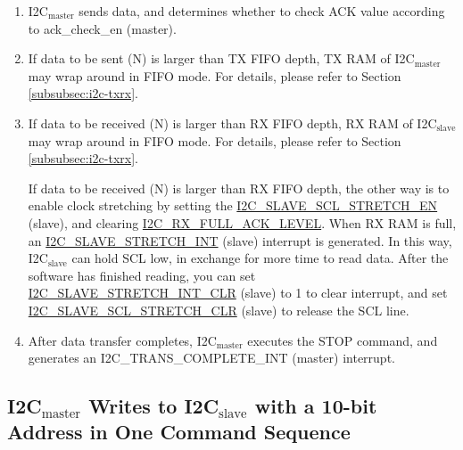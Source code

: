 \documentclass[main\_\_EN.tex]{subfiles}
\begin{document}
\begin{enumerate}
\begin{itemize}
\item Match: If the received ACK value matches ack\_exp (master) (the expected ACK value) in the WRITE command, I2C$_\text{master}$ continues data transfer.
\item Not match: If the received ACK value does not match ack\_exp in the WRITE command, I2C$_\text{master}$ generates an I2C\_NACK\_INT (master) interrupt and stops data transfer.
\end{itemize}

\item I2C$_\text{master}$ sends data, and determines whether to check ACK value according to ack\_check\_en (master).
\item If data to be sent (N) is larger than TX FIFO depth, TX RAM of I2C$_\text{master}$ may wrap around in FIFO mode. For details, please refer to Section \ref{subsubsec:i2c-txrx}.
\item If data to be received (N) is larger than RX FIFO depth, RX RAM of I2C$_\text{slave}$ may wrap around in FIFO mode. For details, please refer to Section \ref{subsubsec:i2c-txrx}.

If data to be received (N) is larger than RX FIFO depth, the other way is to enable clock stretching by setting the \hyperref[fielddesc:I2CSLAVESCLSTRETCHEN]{I2C\_SLAVE\_SCL\_STRETCH\_EN} (slave), and clearing \hyperref[fielddesc:I2CRXFULLACKLEVEL]{I2C\_RX\_FULL\_ACK\_LEVEL}. When RX RAM is full, an \hyperref[int:i2c-slave-stretch]{I2C\_SLAVE\_STRETCH\_INT} (slave) interrupt is generated. In this way, I2C$_\text{slave}$ can hold SCL low, in exchange for more time to read data. After the software has finished reading, you can set \hyperref[fielddesc:I2CSLAVESTRETCHINTCLR]{I2C\_SLAVE\_STRETCH\_INT\_CLR} (slave) to 1 to clear interrupt, and set \hyperref[fielddesc:I2CSLAVESCLSTRETCHCLR]{I2C\_SLAVE\_SCL\_STRETCH\_CLR} (slave) to release the SCL line.
\item After data transfer completes, I2C$_\text{master}$ executes the STOP command, and generates an I2C\_TRANS\_COMPLETE\_INT (master) interrupt.
\end{enumerate}

\subsection{\texorpdfstring{I2C$_\text{master}$ Writes to I2C$_\text{slave}$ with a 10-bit Address in One Command Sequence}{I2C master Writes to I2C slave with a 10-bit Address in One Command Sequence}}
\label{sub:i2c-app-mws10}
\end{document}

